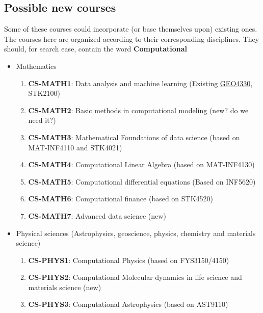 \documentclass[%
oneside,                 %
final,                   %
10pt]{article}
\begin{document}
\subsection{Possible new courses}
Some of these courses could incorporate (or base themselves upon) existing ones. The courses here are organized according to their corresponding disciplines. They should, for search ease, contain the word \textbf{Computational} 
\begin{itemize}
\item Mathematics
\begin{enumerate}

\item \textbf{CS-MATH1}: Data analysis and machine learning (Existing \href{{http://www.uio.no/studier/emner/matnat/geofag/GEO4330/}}{GEO4330}, STK2100)

\item \textbf{CS-MATH2}: Basic methods in computational modeling   (new? do we need it?)

\item \textbf{CS-MATH3}: Mathematical Foundations of data science (based on MAT-INF4110 and STK4021)

\item \textbf{CS-MATH4}: Computational Linear Algebra (based on MAT-INF4130)

\item \textbf{CS-MATH5}: Computational differential equations (Based on INF5620)

\item \textbf{CS-MATH6}: Computational finance (based on STK4520)

\item \textbf{CS-MATH7}: Advanced data science (new)

\end{enumerate}

\noindent
\item Physical sciences (Astrophysics, geoscience, physics, chemistry and materials science)
\begin{enumerate}

\item \textbf{CS-PHYS1}: Computational Physics (based on FYS3150/4150)

\item \textbf{CS-PHYS2}: Computational Molecular dynamics in life science and materials science (new)

\item \textbf{CS-PHYS3}: Computational Astrophysics (based on AST9110)


\end{enumerate}
\end{itemize}
\end{document}
